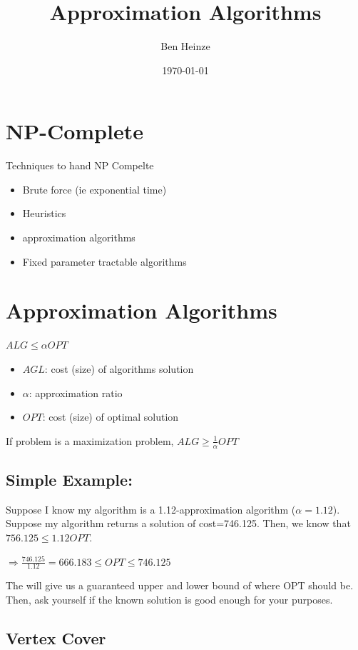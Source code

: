 \documentclass[11pt]{article}
\author{Ben Heinze}
\date{\today}
\title{Approximation Algorithms}
\begin{document}
\maketitle
\tableofcontents



\section{NP-Complete}
\label{sec:orgede471f}

Techniques to hand NP Compelte
\begin{itemize}
\item Brute force (ie exponential time)
\item Heuristics
\item approximation algorithms
\item Fixed parameter tractable algorithms
\end{itemize}

\section{Approximation Algorithms}
\label{sec:org82e08b3}

\(ALG \leq \alpha OPT\)

\begin{itemize}
\item \(AGL\): cost (size) of algorithms solution
\item \(\alpha\): approximation ratio
\item \(OPT\): cost (size) of optimal solution
\end{itemize}


If problem is a maximization problem, \(ALG \geq \frac{1}{\alpha} OPT\)

\subsection{Simple Example:}
\label{sec:orgf9f6a07}
Suppose I know my algorithm is a 1.12-approximation algorithm (\(\alpha=1.12\)). Suppose my algorithm returns a solution of cost=746.125. Then, we know that \(756.125 \leq 1.12 OPT\).

\(\Longrightarrow \frac{746.125}{1.12} = 666.183 \leq OPT \leq 746.125\)

The will give us a guaranteed upper and lower bound of where OPT should be. Then, ask yourself if the known solution is good enough for your purposes.


\subsection{Vertex Cover}
\label{sec:org0e5a726}
\end{document}
